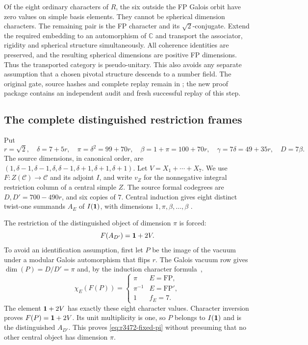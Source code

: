 Of the eight ordinary characters of $R$, the six outside the FP Galois
orbit have zero values on simple basis elements. They cannot be spherical
dimension characters. The remaining pair is the FP character and its
$\sqrt2$-conjugate. Extend the required embedding to an automorphism of
$\mathbb C$ and transport the associator, rigidity and spherical structure
simultaneously. All coherence identities are preserved, and the resulting
spherical dimensions are positive FP dimensions. Thus the transported
category is pseudo-unitary. This also avoids any separate assumption that
a chosen pivotal structure descends to a number field.
The original gate, source hashes and complete replay remain in
; the new proof package
contains an independent audit and fresh successful replay of this step.

\subsection{The complete distinguished restriction frames}
Put
\[
 r=\sqrt2,\quad \delta=7+5r,\quad
 \pi=\delta^2=99+70r,\quad \beta=1+\pi=100+70r,
 \quad \gamma=7\delta=49+35r,\quad D=7\beta.
\]
The source dimensions, in canonical order, are
$(1,\delta-1,\delta-1,\delta,\delta-1,\delta+1,\delta+1,\delta+1)$.
Let $V=X_1+\cdots+X_7$. We use $F:Z(\mathcal C)\to\mathcal C$ and
its adjoint $I$, and write $v_Z$ for the nonnegative integral restriction
column of a central simple $Z$.
The source formal codegrees are $D,D'=700-490r$, and six copies of $7$.
Central induction gives eight distinct twist-one summands $A_E$ of
$I(\mathbf1)$, with dimensions $1,\pi,\beta,\ldots,\beta$
\cite[Theorem~2.13]{OstrikPiv3}.

The restriction of the distinguished object of dimension $\pi$ is forced:
\begin{equation}\label{eq:r3472-fixed-pi}
 F(A_{D'})=\mathbf1+2V.
\end{equation}
To avoid an identification assumption, first let $P$ be the image of the
vacuum under a modular Galois automorphism that flips $r$. The Galois
vacuum row gives $\dim(P)=D/D'=\pi$ and, by the induction character
formula~\cite[Lemma~4.3 and Corollary~4.5]{DeshpandeCenter},
\[
 \chi_E(F(P))=\begin{cases}
 \pi&E=\mathrm{FP},\\
 \pi^{-1}&E=\mathrm{FP}',\\
 1&f_E=7.
 \end{cases}
\]
The element $\mathbf1+2V$ has exactly these eight character values.
Character inversion proves $F(P)=\mathbf1+2V$. Its unit multiplicity is one,
so $P$ belongs to $I(\mathbf1)$ and is the distinguished $A_{D'}$.
This proves \eqref{eq:r3472-fixed-pi} without presuming that no other
central object has dimension $\pi$.

